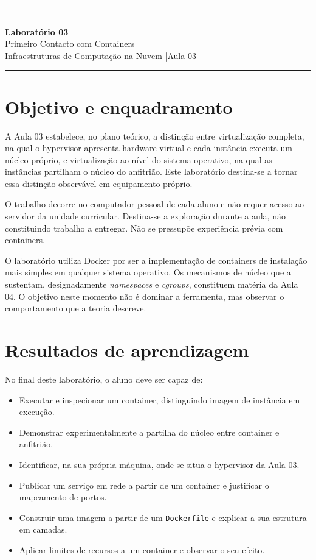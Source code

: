 \documentclass[11pt,a4paper]{article}
\newcommand{\labtitle}[3]{%
  \thispagestyle{empty}
  \begin{center}
  {\color{NudeTaupe}\rule{\textwidth}{0.5pt}}\\[0.5cm]
  {\LARGE\bfseries\color{TextEspresso} Laboratório #1}\\[0.35cm]
  {\large\color{TextEspresso} #2}\\[0.3cm]
  {\normalsize\color{NudeTaupe} Infraestruturas de Computação na Nuvem \quad|\quad #3}\\[0.4cm]
  {\color{NudeTaupe}\rule{\textwidth}{0.5pt}}
  \end{center}
  \vspace{0.4cm}
}
\begin{document}
\labtitle{03}{Primeiro Contacto com Containers}{Aula 03}

\section*{Objetivo e enquadramento}

A Aula 03 estabelece, no plano teórico, a distinção entre virtualização completa, na qual o hypervisor apresenta hardware virtual e cada instância executa um núcleo próprio, e virtualização ao nível do sistema operativo, na qual as instâncias partilham o núcleo do anfitrião. Este laboratório destina-se a tornar essa distinção observável em equipamento próprio.

O trabalho decorre no computador pessoal de cada aluno e não requer acesso ao servidor da unidade curricular. Destina-se a exploração durante a aula, não constituindo trabalho a entregar. Não se pressupõe experiência prévia com containers.

\begin{nota}
O laboratório utiliza Docker por ser a implementação de containers de instalação mais simples em qualquer sistema operativo. Os mecanismos de núcleo que a sustentam, designadamente \emph{namespaces} e \emph{cgroups}, constituem matéria da Aula 04. O objetivo neste momento não é dominar a ferramenta, mas observar o comportamento que a teoria descreve.
\end{nota}

\section*{Resultados de aprendizagem}

No final deste laboratório, o aluno deve ser capaz de:

\begin{itemize}
  \item Executar e inspecionar um container, distinguindo imagem de instância em execução.
  \item Demonstrar experimentalmente a partilha do núcleo entre container e anfitrião.
  \item Identificar, na sua própria máquina, onde se situa o hypervisor da Aula 03.
  \item Publicar um serviço em rede a partir de um container e justificar o mapeamento de portos.
  \item Construir uma imagem a partir de um \texttt{Dockerfile} e explicar a sua estrutura em camadas.
  \item Aplicar limites de recursos a um container e observar o seu efeito.
\end{itemize}
\end{document}
